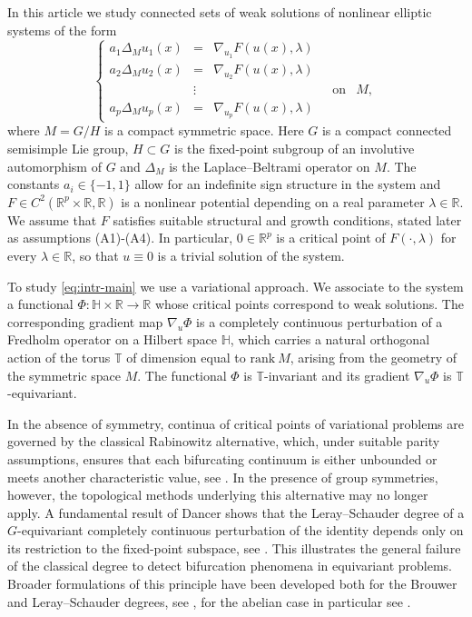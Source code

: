 \documentclass[reqno,twoside,12pt]{amsart}
\newcommand{\bH}{\mathbb{H}}
\newcommand{\bR}{\mathbb{R}}
\newcommand{\bT}{\mathbb{T}}
\numberwithin{equation}{section} \errorcontextlines=0
\newcommand{\rank}{\mathrm{rank}\:}
\begin{document}
In this article we study connected sets of weak solutions of nonlinear elliptic systems of the form
\begin{equation}\label{eq:intr-main}
\left\{\begin{array}{lclcl}
a_1\Delta_M u_1(x)&=&\nabla_{u_1}F(u(x),\lambda) \\
a_2\Delta_M u_2(x)&=&\nabla_{u_2}F(u(x),\lambda) \\
&\vdots&&\ \ \ \text{on}& M, \\
a_p\Delta_M u_p(x) &=&\nabla_{u_p}F(u(x),\lambda)
\end{array}
\right.
\end{equation}
where $M=G/H$ is a compact symmetric space. Here $G$ is a compact connected semisimple Lie group, $H\subset G$ is the fixed-point subgroup of an involutive automorphism of $G$ and $\Delta_M$ is the Laplace--Beltrami operator on $M$. The constants $a_i\in\{-1,1\}$ allow for an indefinite sign structure in the system and $F\in C^2(\bR^p\times\bR,\bR)$ is a nonlinear potential depending on a real parameter $\lambda\in\bR$. We assume that $F$ satisfies suitable structural and growth conditions, stated later as assumptions \textup{(A1)}-\textup{(A4)}. In particular, $0\in\bR^p$ is a critical point of $F(\cdot,\lambda)$ for every $\lambda\in\bR$, so that $u\equiv 0$ is a trivial solution of the system.

To study \eqref{eq:intr-main} we use a variational approach. We associate to the system a functional $\Phi\colon \bH\times\bR\to\bR$ whose critical points correspond to weak solutions. The corresponding gradient map $\nabla_u\Phi$ is a completely continuous perturbation of a Fredholm operator on a Hilbert space $\bH$, which carries a natural orthogonal action of the torus $\bT$ of dimension equal to $\rank M$, arising from the geometry of the symmetric space $M$. The functional $\Phi$ is $\bT$-invariant and its gradient $\nabla_u\Phi$ is $\bT$-equivariant.

In the absence of symmetry, continua of critical points of variational problems are governed by the classical Rabinowitz alternative, which, under suitable parity assumptions, ensures that each bifurcating continuum is either unbounded or meets another characteristic value, see \cite{Nirenberg, Rabinowitz1971, Rabinowitz1986}. In the presence of group symmetries, however, the topological methods underlying this alternative may no longer apply. A fundamental result of Dancer shows that the Leray--Schauder degree of a $G$-equivariant completely continuous perturbation of the identity depends only on its restriction to the fixed-point subspace, see \cite{Dancer1982}. This illustrates the general failure of the classical degree to detect bifurcation phenomena in equivariant problems. Broader formulations of this principle have been developed both for the Brouwer and Leray--Schauder degrees, see \cite{KusBal}, for the abelian case in particular see \cite{IzeVig}.
\end{document}
